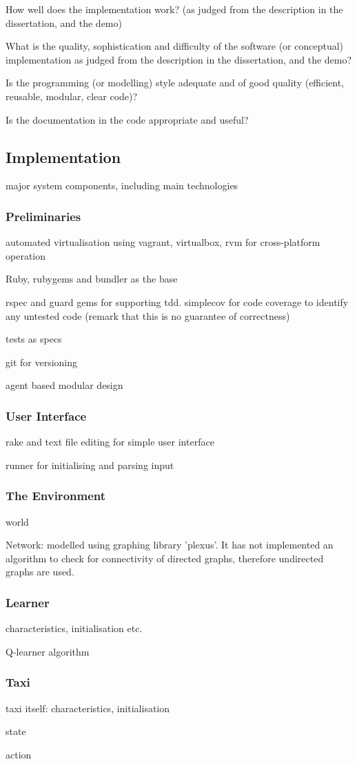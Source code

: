 How well does the implementation work? (as judged from the description in the
dissertation, and the demo)

What is the quality, sophistication and difficulty of the software (or
conceptual) implementation as judged from the description in the dissertation,
and the demo?

Is the programming (or modelling) style adequate and of good quality
(efficient, reusable, modular, clear code)?

Is the documentation in the code appropriate and useful?


\subsection{Implementation}

major system components, including main technologies



\subsubsection{Preliminaries}

automated virtualisation using vagrant, virtualbox, rvm for cross-platform
operation

Ruby, rubygems and bundler as the base

rspec and guard gems for supporting tdd. simplecov for code coverage to
identify any untested code (remark that this is no guarantee of correctness)

tests as specs

git for versioning

agent based modular design


\subsubsection{User Interface}

rake and text file editing for simple user interface

runner for initialising and parsing input 


\subsubsection{The Environment}

world

Network: modelled using graphing library 'plexus'. It has not implemented an
algorithm to check for connectivity of directed graphs, therefore undirected
graphs are used.


\subsubsection{Learner}

characteristics, initialisation etc.

Q-learner algorithm


\subsubsection{Taxi}

taxi itself: characteristics, initialisation

state

action
